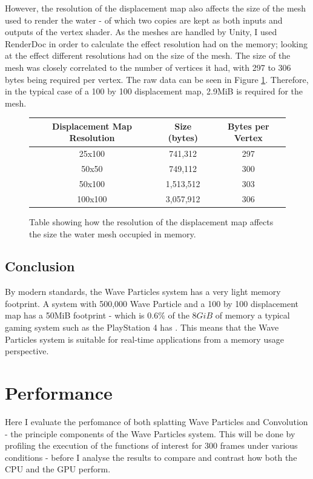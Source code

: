 \documentclass[12pt,a4paper,twoside]{report}
\begin{document}
However, the resolution of the displacement map also affects the size of the
mesh used to render the water - of which two copies are kept as both inputs and
outputs of the vertex shader. As the meshes are handled by Unity, I used
RenderDoc in order to calculate the effect resolution had on the memory;
looking at the effect different resolutions had on the size of the mesh. The
size of the mesh was closely correlated to the number of vertices it had, with
297 to 306 bytes being required per vertex. The raw data can be seen in Figure
\ref{fig:table_mesh_sizes}. Therefore, in the typical case of a 100 by 100
displacement map, 2.9MiB is required for the mesh.

\begin{figure}[h]
\begin{center}
\begin{tabular}{|c | c c |} 
\hline
 Displacement Map Resolution & Size (bytes) & Bytes per Vertex\\ [0.5ex] 
\hline\hline
25x100 & 741,312 & 297 \\ 
\hline
50x50 & 749,112  & 300 \\
\hline
50x100 & 1,513,512 & 303 \\
\hline
100x100 & 3,057,912 & 306 \\ [1ex] 
\hline
\end{tabular}
\end{center}
\caption{Table showing how the resolution of the displacement map affects the
size the water mesh occupied in memory.}
\label{fig:table_mesh_sizes}
\end{figure}

\subsection{Conclusion}

By modern standards, the Wave Particles system has a very light memory
footprint. A system with 500,000 Wave Particle and a 100 by 100 displacement
map has a 50MiB footprint - which is $0.6\%$ of the $8GiB$ of memory a typical
gaming system such as the PlayStation 4 has \cite{DFPS4}. This means that the
Wave Particles system is suitable for real-time applications from a memory
usage perspective.

\section{Performance}

Here I evaluate the perfomance of both splatting Wave
Particles and Convolution - the principle components of the Wave Particles
system. This will be done by profiling the execution of the functions of
interest for 300 frames under various conditions - before I analyse the results
to compare and contrast how both the CPU and the GPU perform.
\end{document}
